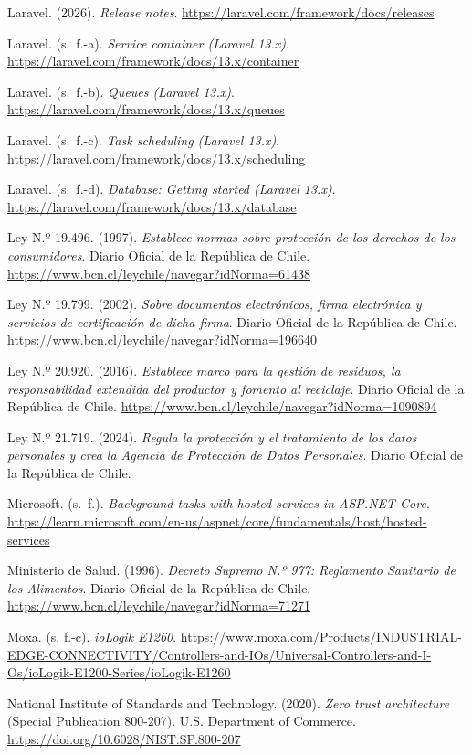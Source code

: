 \begin{list}{}{\setlength{\leftmargin}{1.27cm}\setlength{\itemindent}{-1.27cm}\setlength{\itemsep}{0.5\baselineskip}\raggedright}
\item Laravel. (2026). \textit{Release notes}. \url{https://laravel.com/framework/docs/releases}
\item Laravel. (s.~f.-a). \textit{Service container (Laravel 13.x)}. \url{https://laravel.com/framework/docs/13.x/container}
\item Laravel. (s.~f.-b). \textit{Queues (Laravel 13.x)}. \url{https://laravel.com/framework/docs/13.x/queues}
\item Laravel. (s.~f.-c). \textit{Task scheduling (Laravel 13.x)}. \url{https://laravel.com/framework/docs/13.x/scheduling}
\item Laravel. (s.~f.-d). \textit{Database: Getting started (Laravel 13.x)}. \url{https://laravel.com/framework/docs/13.x/database}
\item Ley N.º 19.496. (1997). \textit{Establece normas sobre protección de los derechos de los consumidores}. Diario Oficial de la República de Chile. \url{https://www.bcn.cl/leychile/navegar?idNorma=61438}
\item Ley N.º 19.799. (2002). \textit{Sobre documentos electrónicos, firma electrónica y servicios de certificación de dicha firma}. Diario Oficial de la República de Chile. \url{https://www.bcn.cl/leychile/navegar?idNorma=196640}
\item Ley N.º 20.920. (2016). \textit{Establece marco para la gestión de residuos, la responsabilidad extendida del productor y fomento al reciclaje}. Diario Oficial de la República de Chile. \url{https://www.bcn.cl/leychile/navegar?idNorma=1090894}
\item Ley N.º 21.719. (2024). \textit{Regula la protección y el tratamiento de los datos personales y crea la Agencia de Protección de Datos Personales}. Diario Oficial de la República de Chile.
\item Microsoft. (s.~f.). \textit{Background tasks with hosted services in ASP.NET Core}. \url{https://learn.microsoft.com/en-us/aspnet/core/fundamentals/host/hosted-services}
\item Ministerio de Salud. (1996). \textit{Decreto Supremo N.º 977: Reglamento Sanitario de los Alimentos}. Diario Oficial de la República de Chile. \url{https://www.bcn.cl/leychile/navegar?idNorma=71271}
\item Moxa. (s. f.-c). \textit{ioLogik E1260}. \url{https://www.moxa.com/Products/INDUSTRIAL-EDGE-CONNECTIVITY/Controllers-and-IOs/Universal-Controllers-and-I-Os/ioLogik-E1200-Series/ioLogik-E1260}
\item National Institute of Standards and Technology. (2020). \textit{Zero trust architecture} (Special Publication 800-207). U.S. Department of Commerce. \url{https://doi.org/10.6028/NIST.SP.800-207}

\end{list}
